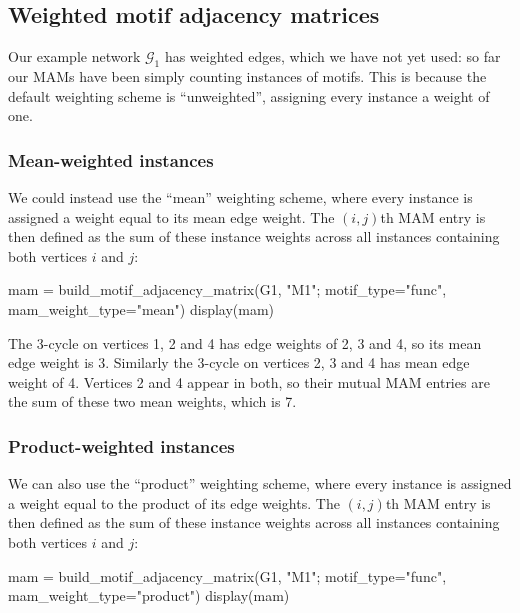 \documentclass{article}
\begin{document}
\subsection{Weighted motif adjacency matrices}

Our example network $\mathcal{G}_1$ has weighted edges,
which we have not yet used:
so far our MAMs have been simply counting
instances of motifs.
This is because the default weighting scheme is
``unweighted'', assigning every instance a weight of one.

\subsubsection{Mean-weighted instances}

We could instead use the ``mean'' weighting scheme,
where every instance is assigned a weight equal to its
mean edge weight.
The $(i,j)$th MAM entry is then defined as the sum of these
instance weights across all instances containing
both vertices $i$ and $j$:

\begin{tcolorbox}[colback=black!5!white,colframe=black!15!white]
\begin{juliablock}
mam = build_motif_adjacency_matrix(G1, "M1"; motif_type="func",
                                   mam_weight_type="mean")
display(mam)
\end{juliablock}
\texttt{\obeylines\printpythontex}
\end{tcolorbox}

The 3-cycle on vertices 1, 2 and 4
has edge weights of 2, 3 and 4, so its mean edge weight is 3.
Similarly the 3-cycle on vertices 2, 3 and 4 has mean edge weight of 4.
Vertices 2 and 4 appear in both, so their mutual MAM entries are the
sum of these two mean weights, which is 7.

\subsubsection{Product-weighted instances}

We can also use the ``product'' weighting scheme,
where every instance is assigned a weight equal to the
product of its edge weights.
The $(i,j)$th MAM entry is then defined as the sum of these
instance weights across all instances containing
both vertices $i$ and $j$:

\begin{tcolorbox}[colback=black!5!white,colframe=black!15!white]
\begin{juliablock}
mam = build_motif_adjacency_matrix(G1, "M1"; motif_type="func",
                                   mam_weight_type="product")
display(mam)
\end{juliablock}
\texttt{\obeylines\printpythontex}
\end{tcolorbox}
\end{document}
